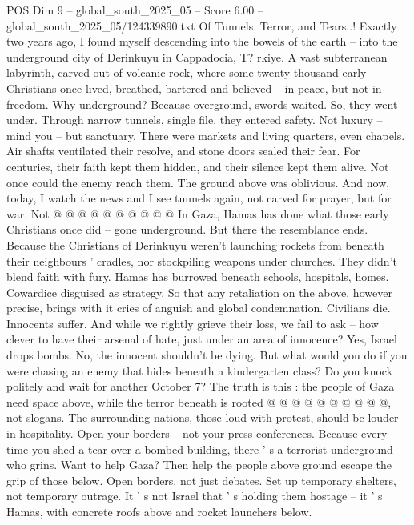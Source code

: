 \begin{textsample}{POS Dim 9 – global\_south\_2025\_05 – Score 6.00 – global\_south\_2025\_05/124339890.txt}  \label{ex:f9_pos_206}
Of Tunnels, Terror, and Tears..!
Exactly two years ago, I found myself descending into the bowels of the earth -- into the underground city of Derinkuyu in Cappadocia, T? rkiye.
A vast subterranean labyrinth, carved out of volcanic rock, where some twenty thousand early Christians once lived, breathed, bartered and believed -- in peace, but not in freedom.
Why underground?
Because overground, swords waited.
So, they went under.
Through narrow tunnels, single file, they entered safety.
Not luxury -- mind you -- but sanctuary.
There were markets and living quarters, even chapels.
Air shafts ventilated their resolve, and stone doors sealed their fear.
For centuries, their faith kept them hidden, and their silence kept them alive.
Not once could the enemy reach them.
The ground above was oblivious.
And now, today, I watch the news and I see tunnels again, not carved for prayer, but for war.
Not @ @ @ @ @ @ @ @ @ @ In Gaza, Hamas has done what those early Christians once did -- gone underground.
But there the resemblance ends.
Because the Christians of Derinkuyu weren't launching rockets from beneath their neighbours ' cradles, nor stockpiling weapons under churches.
They didn't blend faith with fury.
Hamas has burrowed beneath schools, hospitals, homes.
Cowardice disguised as strategy.
So that any retaliation on the above, however precise, brings with it cries of anguish and global condemnation.
Civilians die.
Innocents suffer.
And while we rightly grieve their loss, we fail to ask -- how clever to have their arsenal of hate, just under an area of innocence?
Yes, Israel drops bombs.
No, the innocent shouldn't be dying.
But what would you do if you were chasing an enemy that hides beneath a kindergarten class?
Do you knock politely and wait for another October 7?
The truth is this : the people of Gaza need space above, while the terror beneath is rooted @ @ @ @ @ @ @ @ @ @, not slogans.
The surrounding nations, those loud with protest, should be louder in hospitality.
Open your borders -- not your press conferences.
Because every time you shed a tear over a bombed building, there ' s a terrorist underground who grins.
Want to help Gaza?
Then help the people above ground escape the grip of those below.
Open borders, not just debates.
Set up temporary shelters, not temporary outrage.
It ' s not Israel that ' s holding them hostage -- it ' s Hamas, with concrete roofs above and rocket launchers below.

\end{textsample}

